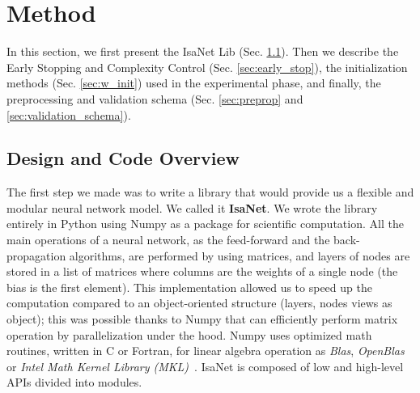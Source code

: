\documentclass[11pt]{article}
\begin{document}
\section{Method}
\label{sec:isanet_lib}
In this section, we first present the IsaNet Lib (Sec. \ref{sec:design_code}). Then we describe the Early Stopping and Complexity Control (Sec. \ref{sec:early_stop}), the initialization methods (Sec. \ref{sec:w_init}) used in the experimental phase, and finally, the preprocessing and validation schema (Sec. \ref{sec:preprop} and \ref{sec:validation_schema}).

\subsection{Design and Code Overview}
\label{sec:design_code}
The first step we made was to write a library that would provide us a flexible and modular neural network model. We called it \textbf{IsaNet}. We wrote the library entirely in Python using Numpy as a package for scientific computation. All the main operations of a neural network, as the feed-forward and the back-propagation algorithms, are performed by using matrices, and layers of nodes are stored in a list of matrices where columns are the weights of a single node (the bias is the first element). This implementation allowed us to speed up the computation compared to an object-oriented structure (layers, nodes views as object); this was possible thanks to Numpy that can efficiently perform matrix operation by parallelization under the hood. Numpy uses optimized math routines, written in C or Fortran, for linear algebra operation as \textit{Blas}, \textit{OpenBlas} or \textit{Intel Math Kernel Library (MKL)}~\cite{intel-alt}. IsaNet is composed of low and high-level APIs divided into modules.\\
\end{document}
